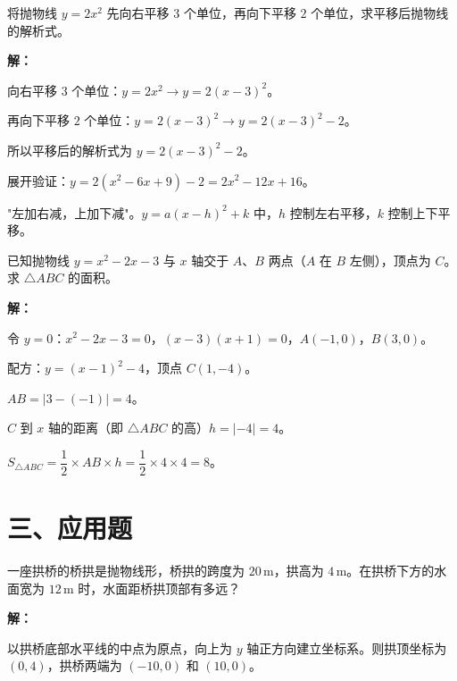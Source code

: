 \documentclass[12pt, a4paper]{ctexart}
\begin{document}
\begin{examplebox}[【例7】抛物线的平移]
将抛物线 $y = 2x^2$ 先向右平移 $3$ 个单位，再向下平移 $2$ 个单位，求平移后抛物线的解析式。
\end{examplebox}

\textbf{解：}

向右平移 $3$ 个单位：$y = 2x^2 \to y = 2(x-3)^2$。

再向下平移 $2$ 个单位：$y = 2(x-3)^2 \to y = 2(x-3)^2 - 2$。

所以平移后的解析式为 $\boxed{y = 2(x-3)^2 - 2}$。

展开验证：$y = 2(x^2-6x+9) - 2 = 2x^2 - 12x + 16$。

\begin{tipbox}[平移口诀]
"左加右减，上加下减"。$y=a(x-h)^2+k$ 中，$h$ 控制左右平移，$k$ 控制上下平移。
\end{tipbox}

\begin{examplebox}
已知抛物线 $y = x^2 - 2x - 3$ 与 $x$ 轴交于 $A$、$B$ 两点（$A$ 在 $B$ 左侧），顶点为 $C$。求 $\triangle ABC$ 的面积。
\end{examplebox}

\textbf{解：}

令 $y=0$：$x^2-2x-3=0$，$(x-3)(x+1)=0$，$A(-1,0)$，$B(3,0)$。

配方：$y=(x-1)^2-4$，顶点 $C(1,-4)$。

$AB = |3-(-1)| = 4$。

$C$ 到 $x$ 轴的距离（即 $\triangle ABC$ 的高）$h = |-4| = 4$。

$S_{\triangle ABC} = \dfrac{1}{2} \times AB \times h = \dfrac{1}{2} \times 4 \times 4 = \boxed{8}$。

\section*{\textcolor{apppurple}{三、应用题}}

\begin{appbox}[【应用1】抛物线型拱桥]
一座拱桥的桥拱是抛物线形，桥拱的跨度为 $20$\,m，拱高为 $4$\,m。在拱桥下方的水面宽为 $12$\,m 时，水面距桥拱顶部有多远？
\end{appbox}

\textbf{解：}

以拱桥底部水平线的中点为原点，向上为 $y$ 轴正方向建立坐标系。则拱顶坐标为 $(0,4)$，拱桥两端为 $(-10,0)$ 和 $(10,0)$。
\end{document}
